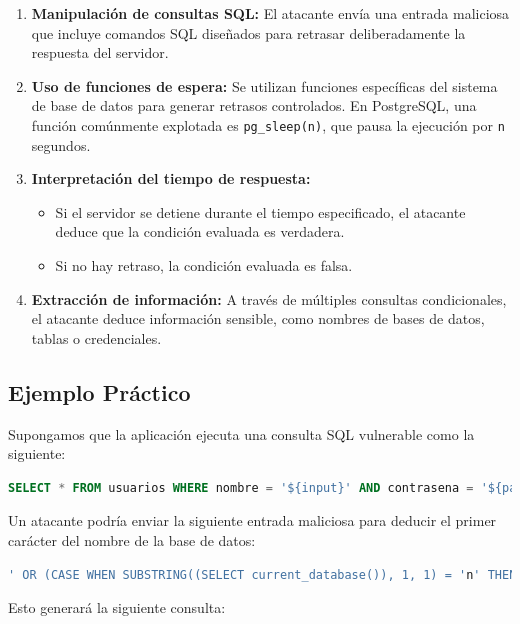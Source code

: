 \documentclass[a4paper,12pt]{article}
\begin{document}
\begin{enumerate}
    \item \textbf{Manipulación de consultas SQL:}  
    El atacante envía una entrada maliciosa que incluye comandos SQL diseñados para retrasar deliberadamente la respuesta del servidor.

    \item \textbf{Uso de funciones de espera:}  
    Se utilizan funciones específicas del sistema de base de datos para generar retrasos controlados. En PostgreSQL, una función comúnmente explotada es \texttt{pg\_sleep(n)}, que pausa la ejecución por \texttt{n} segundos.

    \item \textbf{Interpretación del tiempo de respuesta:}  
    \begin{itemize}
        \item Si el servidor se detiene durante el tiempo especificado, el atacante deduce que la condición evaluada es verdadera.
        \item Si no hay retraso, la condición evaluada es falsa.
    \end{itemize}

    \item \textbf{Extracción de información:}  
    A través de múltiples consultas condicionales, el atacante deduce información sensible, como nombres de bases de datos, tablas o credenciales.
\end{enumerate}

\subsection{Ejemplo Práctico}

Supongamos que la aplicación ejecuta una consulta SQL vulnerable como la siguiente:

\begin{lstlisting}[language=SQL]
SELECT * FROM usuarios WHERE nombre = '${input}' AND contrasena = '${password}';
\end{lstlisting}

Un atacante podría enviar la siguiente entrada maliciosa para deducir el primer carácter del nombre de la base de datos:

\begin{lstlisting}[language=SQL]
' OR (CASE WHEN SUBSTRING((SELECT current_database()), 1, 1) = 'n' THEN pg_sleep(5) ELSE pg_sleep(0) END) --
\end{lstlisting}

Esto generará la siguiente consulta:
\end{document}
